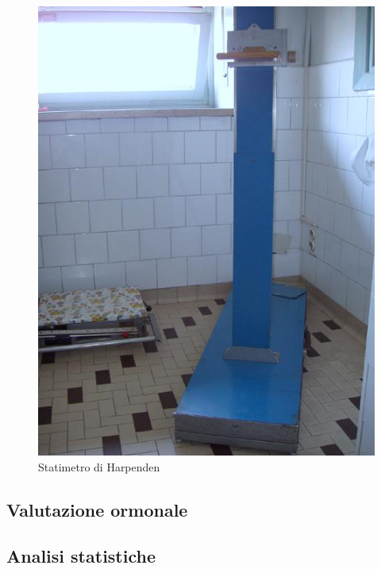 \begin{figure}[h]
  \begin{center}
	\includegraphics[scale=0.50]{grafici/statimetro.jpg}
  \end{center}
  \caption{Statimetro di Harpenden}
\end{figure}

\subsection{Valutazione ormonale}

\subsection{Analisi statistiche}
